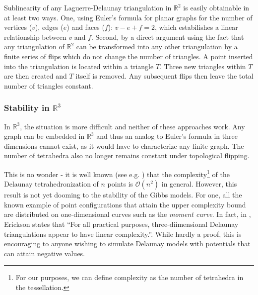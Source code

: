 \documentclass[12pt,a4paper]{article}
\newcommand{\R}{{\mathbb R^3}}
\theoremstyle{definition}
\theoremstyle{remark}
\theoremstyle{theorem}
\begin{document}
Sublinearity of any Laguerre-Delaunay triangulation in $\mathbb R^2$ is easily obtainable in at least two ways. One, using Euler's formula for planar graphs for the number of vertices ($v$), edges ($e$) and faces ($f$): $v-e+f=2$, which estabilishes a linear relationship between $v$ and $f$. Second, by a direct argument using the fact that any triangulation of $\mathbb R^2$ can be transformed into any other triangulation by a finite series of flips which do not change the number of triangles\cite{Lawson72}. A point inserted into the triangulation is located within a triangle $T$. Three new triangles within $T$ are then created and $T$ itself is removed. Any subsequent flips then leave the total number of triangles constant.\newline

\subsubsection{Stability in $\R$}
In $\R$, the situation is more difficult and neither of these approaches work. Any graph can be embedded in $\R$\cite{3dGraph} and thus an analog to Euler's formula in three dimensions cannot exist, as it would have to characterize any finite graph. The number of tetrahedra also no longer remains constant under topological flipping\cite{Joe91}. 

This is no wonder - it is well known (see e.g. \cite{Amenta07}) that the complexity\footnote{For our purposes, we can define complexity as the number of tetrahedra in the tessellation.} of the Delaunay tetrahedronization of $n$ points is $\mathcal O(n^2)$ in general. However, this result is not yet dooming to the stability of the Gibbs models. For one, all the known example of point configurations that attain the upper complexity bound are distributed on one-dimensional curves such as the \textit{moment curve}\cite{Amenta07}. In fact, in \cite{Erickson01}, Erickson states that ``For all practical purposes, three-diimensional Delaunay triangulations appear to have linear complexity.''. While hardly a proof, this is encouraging to anyone wishing to simulate Delaunay models with potentials that can attain negative values.
\end{document}
